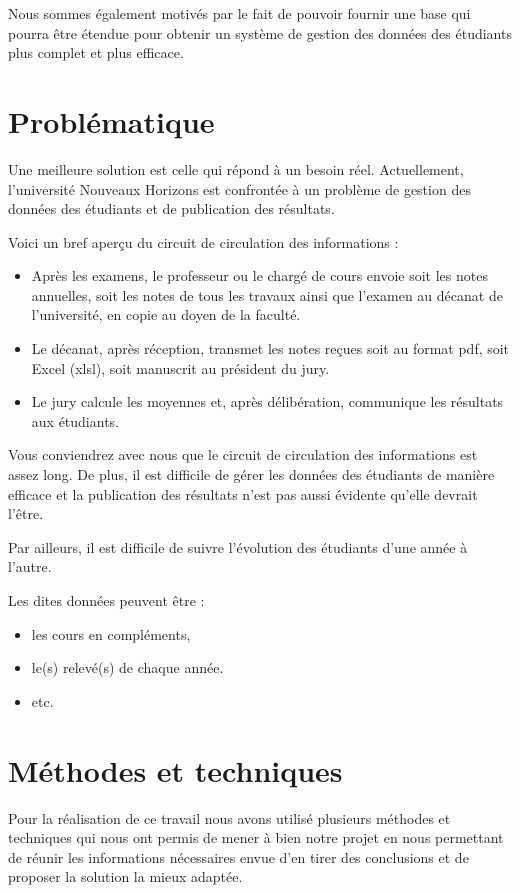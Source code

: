 Nous sommes également motivés par le fait de pouvoir fournir une base qui pourra être étendue pour obtenir un système de gestion des données des étudiants plus complet et plus efficace.
\section{Problématique}
Une meilleure solution est celle qui répond à un besoin réel. Actuellement, l'université Nouveaux Horizons est confrontée à un problème de gestion des données des étudiants et de publication des résultats.

Voici un bref aperçu du circuit de circulation des informations :

\begin{itemize}
    \item Après les examens, le professeur ou le chargé de cours envoie soit les notes annuelles, soit les notes de tous les travaux ainsi que l'examen au décanat de l'université, en copie au doyen de la faculté.
    \item Le décanat, après réception, transmet les notes reçues soit au format pdf, soit Excel (xlsl), soit manuscrit au président du jury.
    \item Le jury calcule les moyennes et, après délibération, communique les résultats aux étudiants.
\end{itemize}

Vous conviendrez avec nous que le circuit de circulation des informations est assez long. De plus, il est difficile de gérer les données des étudiants de manière efficace et la publication des résultats n'est pas aussi évidente qu'elle devrait l'être.

Par ailleurs, il est difficile de suivre l'évolution des étudiants d'une année à l'autre.

Les dites données peuvent être :
\begin{itemize}
    \item les cours en compléments,
    \item le(s) relevé(s) de chaque année.
    \item etc.
\end{itemize}

\section{Méthodes et techniques}
Pour la réalisation de ce travail nous avons utilisé plusieurs méthodes et techniques qui nous
ont permis de mener à bien notre projet en nous permettant de réunir les informations nécessaires
envue d'en tirer des conclusions et de proposer la solution la mieux adaptée.

